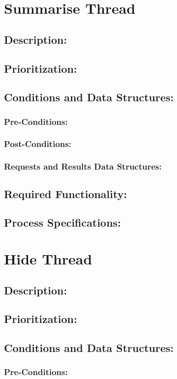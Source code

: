\documentclass[a4paper,11pt]{article}
\begin{document}
\section{Summarise Thread}
\subsection*{Description:}
\subsection{Prioritization:} 
\subsection{Conditions and Data Structures:}
\subsubsection*{Pre-Conditions:}
\subsubsection*{Post-Conditions:}
\subsubsection*{Requests and Results Data Structures:}
\subsection{Required Functionality:} 
\subsection{Process Specifications:} 

\section{Hide Thread}
\subsection*{Description:}
\subsection{Prioritization:} 
\subsection{Conditions and Data Structures:}
\subsubsection*{Pre-Conditions:}
\end{document}
